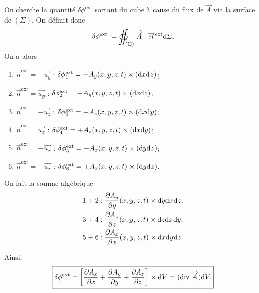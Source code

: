         On cherche la quantité $\delta \phi^{\text{ext}}$ sortant du cube à cause du flux de $\vec{A}$ via la surface de $(\Sigma)$.
        On définit donc 
        \begin{equation}
            \delta \phi^{\text{ext}}\coloneqq\oiint_{(\Sigma)}\protect\overrightarrow{{A}}\cdot\protect\overrightarrow{{n}}^{\text{ext}}\mathrm{d}\Sigma.
        \end{equation}
        On a alors
        \begin{enumerate}[label=(\arabic*)]
            \item $\vec{n}^{\text{ext}}=-\vec{u_y}$ : $\delta \phi_{1}^{\text{ext}}=-A_y(x,y,z,t)\times(\mathrm{d} x\mathrm{d} z)$;
            \item $\vec{n}^{\text{ext}}=\vec{u_y}$ : $\delta \phi_{2}^{\text{ext}}=+A_y(x,y,z,t)\times(\mathrm{d} x\mathrm{d} z)$;
            \item $\vec{n}^{\text{ext}}=-\vec{u_z}$ : $\delta \phi_{3}^{\text{ext}}=-A_z(x,y,z,t)\times(\mathrm{d} x\mathrm{d} y)$;
            \item $\vec{n}^{\text{ext}}=\vec{u_z}$ : $\delta \phi_{4}^{\text{ext}}=+A_z(x,y,z,t)\times(\mathrm{d} x\mathrm{d} y)$;
            \item $\vec{n}^{\text{ext}}=-\vec{u_x}$ : $\delta \phi_{5}^{\text{ext}}=-A_x(x,y,z,t)\times(\mathrm{d} y\mathrm{d} z)$;
            \item $\vec{n}^{\text{ext}}=-\vec{u_x}$ : $\delta \phi_{6}^{\text{ext}}=+A_x(x,y,z,t)\times(\mathrm{d} y\mathrm{d} z)$.
        \end{enumerate}

        On fait la somme algébrique
        \begin{equation}
            \begin{aligned}
                1+2 &: \frac{\partial A_y}{\partial y}(x,y,z,t)\times\mathrm{d} y\mathrm{d} x\mathrm{d} z,\\
                3+4 &: \frac{\partial A_z}{\partial z}(x,y,z,t)\times\mathrm{d} z\mathrm{d} x\mathrm{d} y,\\
                5+6 &: \frac{\partial A_x}{\partial x}(x,y,z,t)\times\mathrm{d} x\mathrm{d} y\mathrm{d} z.
            \end{aligned}
        \end{equation}

        Ainsi,
        \begin{equation}
            \boxed{
                \delta \phi^{\text{ext}}=\left[
                    \frac{\partial A_x}{\partial x}+\frac{\partial A_y}{\partial y}+\frac{\partial A_z}{\partial z}
                \right]\times \mathrm{d} V=(\operatorname{div}\protect\overrightarrow{{A}})\mathrm{d} V.
            }
        \end{equation}


